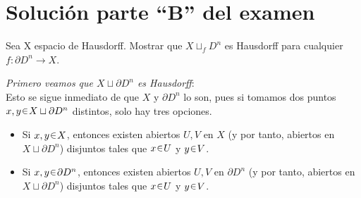 \section{Solución parte \enquote{B} del examen}

\setcounter{eje}{3}
\begin{ejer}
Sea X espacio de Hausdorff. Mostrar que $X \sqcup_f D^n$ es Hausdorff para cualquier $f \colon \partial D^n \to X$.
\end{ejer}
\begin{sol}[Demostración]
\emph{Primero veamos que $X \sqcup \partial D^n$ es Hausdorff}:\\
Esto se sigue inmediato de que $X$ y $\partial D^n$ lo son, pues si tomamos dos puntos $x,y \en X \sqcup \partial D^n$ distintos, solo hay tres opciones.
\begin{itemize}
\item Si $x,y \en X$, entonces existen abiertos $U,V$ en $X$ (y por tanto, abiertos en $X \sqcup \partial D^n$) disjuntos tales que $x \en U$ y $y \en V$.

\item Si $x,y \en \partial D^n$, entonces existen abiertos $U,V$ en $\partial D^n$ (y por tanto, abiertos en $X \sqcup \partial D^n$) disjuntos tales que $x \en U$ y $y \en V$.


\end{itemize}
\end{sol}
